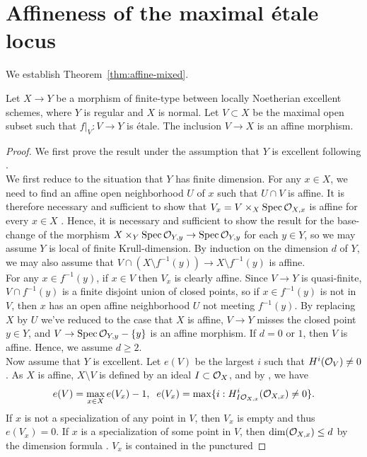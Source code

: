 \section{Affineness of the maximal \'{e}tale locus}
We establish Theorem~\ref{thm:affine-mixed}.
\begin{theorem}
Let $X \to Y$ be a morphism of finite-type between locally Noetherian excellent schemes, where $Y$ is regular and $X$ is normal. 
Let $V \subset X$ be the maximal open subset such that $f|_V: V \to Y$ is \'{e}tale. The inclusion $V \to X$ is an affine morphism.
\end{theorem}
\begin{proof}
We first prove the result under the assumption that $Y$ is excellent following \cite[0ECD]{sp}.\\
\indent We first reduce to the situation that $Y$ has finite dimension.
For any $x \in X$, we need to find an affine open neighborhood $U$ of $x$ such that $U \cap V$ is affine. 
It is therefore necessary and sufficient to show that $V_x = V \times_X \spec{\cal{O}_{X,x}}$ is affine for every $x \in X$ \cite[01Z6]{sp}. 
Hence, it is necessary and sufficient to show the result for the base-change of the morphism
$X \times_Y \spec{\cal{O}_{Y,y}} \to \spec{\cal{O}_{Y,y}}$ for each $y \in Y$, so we may assume $Y$ is local of finite Krull-dimension. 
By induction on the dimension $d$ of $Y$, we may also assume that $V \cap (X \setminus f^{-1}(y)) \to X \setminus f^{-1}(y)$ is affine.\\
\indent For any $x \in f^{-1}(y)$, if $x \in V$ then $V_x$ is clearly affine.
Since $V \to Y$ is quasi-finite, $V \cap f^{-1}(y)$ is a finite disjoint union of closed points, so if $x \in f^{-1}(y)$ is not in $V$, 
then $x$ has an open affine neighborhood $U$ not meeting $f^{-1}(y)$. By replacing $X$ by $U$ we've reduced to the case that $X$ is affine, $V \to Y$ misses the closed point $y \in Y$, and 
$V \to \spec{\cal{O}_{Y,y}}-\{y\}$ is an affine morphism. If $d =0$ or $1$, then $V$ is affine. Hence, we assume $d \ge 2$.\\
\indent Now assume that $Y$ is excellent. Let $e(V)$ be the largest $i$ such that $H^i(\cal{O}_V) \neq 0$. As $X$ is affine, $X \setminus V$ is defined by an ideal $I \subset \cal{O}_X$, and by \cite[0DXB]{sp}, we have
\[e(V)= \max_{x \in X} e(V_x) - 1, \; \; e(V_x) = \max \{i: H^i_{I\cal{O}_{X,x}}(\cal{O}_{X,x}) \neq 0\}.\]
If $x$ is not a specialization of any point in $V$, then $V_x$ is empty and thus $e(V_x)=0$.
If $x$ is a specialization of some point in $V$, then $\mathrm{dim}(\cal{O}_{X,x}) \le d$ by the dimension formula \cite[02JU]{sp}. $V_x$ is contained in the punctured 

\end{proof}
